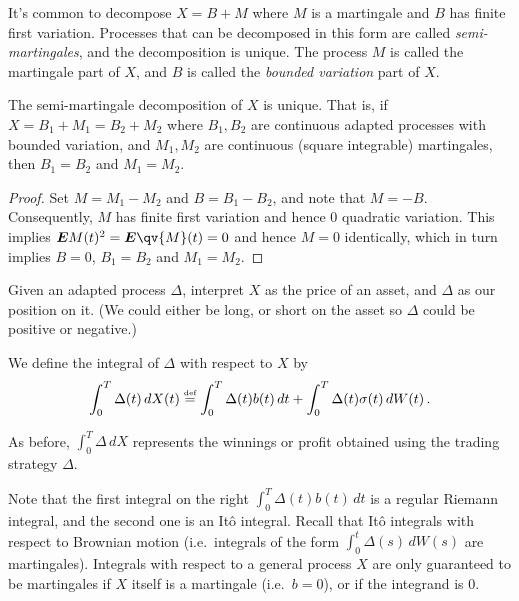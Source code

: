 \begin{remark}
  It's common to decompose $X = B + M$ where $M$ is a martingale and $B$ has finite first variation.
  Processes that can be decomposed in this form are called \emph{semi-martingales}, and the decomposition is unique.
  The process $M$ is called the martingale part of $X$, and $B$ is called the \emph{bounded variation} part of $X$.
\end{remark}

\begin{proposition}\label{p:3smuniq}
  The semi-martingale decomposition of $X$ is unique.
  That is, if $X = B_1 + M_1 = B_2 + M_2$ where $B_1, B_2$ are continuous adapted processes with bounded variation, and $M_1, M_2$ are continuous (square integrable) martingales, then $B_1 = B_2$ and $M_1 = M_2$.
\end{proposition}
\begin{proof}
  Set $M = M_1 - M_2$ and $B = B_1 - B_2$, and note that $M = -B$.
  Consequently, $M$ has finite first variation and hence $0$ quadratic variation.
  This implies $\E M(t)^2 = \E \qv{M}(t) = 0$ and hence $M = 0$ identically, which in turn implies $B = 0$, $B_1 = B_2$ and $M_1 = M_2$.
\end{proof}

Given an adapted process $\Delta$, interpret $X$ as the price of an asset, and $\Delta$ as our position on it.
(We could either be long, or short on the asset so $\Delta$ could be positive or negative.)

\begin{definition}
  We define the  integral of $\Delta$ with respect to $X$ by
  \begin{equation*}
    \int_0^T \Delta(t) \, dX(t)
      \stackrel{\scriptscriptstyle\textup{def}}{=} \int_0^T \Delta(t) b(t) \, dt 
	+ \int_0^T \Delta(t) \sigma(t) \, dW(t)\,.
  \end{equation*}
\end{definition}

As before, $\int_0^T \Delta \, dX$ represents the winnings or profit obtained using the trading strategy $\Delta$.

\begin{remark}
  Note that the first integral on the right $\int_0^T \Delta(t) b(t) \, dt$ is a regular Riemann integral, and the second one is an It\^o integral.
  Recall that It\^o integrals with respect to Brownian motion (i.e.\ integrals of the form $\int_0^t \Delta(s) \, dW(s)$ are martingales).
  Integrals with respect to a general process $X$ are only guaranteed to be martingales if $X$ itself is a martingale (i.e.\ $b = 0$), or if the integrand is $0$.
\end{remark}

